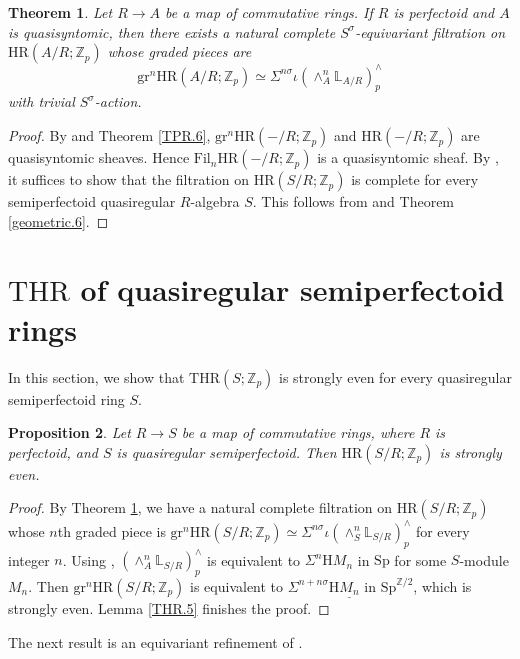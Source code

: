\documentclass[10pt]{amsart}
\newtheorem{thm}{Theorem}[section]
\newtheorem{prop}[thm]{Proposition}
\theoremstyle{definition}
\numberwithin{equation}{section}
\renewcommand{\L}{\mathbb{L}}
\newcommand{\Z}{\mathbb{Z}}
\newcommand{\rH}{\mathrm{H}}
\newcommand{\ul}{\underline}
\newcommand{\Sp}{\mathrm{Sp}}
\newcommand{\gr}{\mathrm{gr}}
\newcommand{\Fil}{\mathrm{Fil}}
\newcommand{\HR}{\mathrm{HR}}
\newcommand{\THR}{\mathrm{THR}}
\begin{document}
{\begin{thm}
\label{descent.3}
Let $R\to A$ be a map of commutative rings.
If $R$ is perfectoid and $A$ is quasisyntomic,
then there exists a natural complete $S^\sigma$-equivariant filtration on $\HR(A/R;\Z_p)$ whose graded pieces are
\[
\gr^n \HR(A/R;\Z_p)
\simeq
\Sigma^{n\sigma}\iota (\wedge_A^n \L_{A/R})_p^\wedge
\]
with trivial $S^\sigma$-action.
\end{thm}
\begin{proof}
By \cite[Remark 4.9]{BMS19} and Theorem \ref{TPR.6},
$\gr^n \HR(-/R;\Z_p)$ and $\HR(-/R;\Z_p)$ are quasisyntomic sheaves.
Hence $\Fil_n\HR(-/R;\Z_p)$ is a quasisyntomic sheaf.
By \cite[Proposition 4.31, Variant 4.33]{BMS19},
it suffices to show that the filtration on $\HR(S/R;\Z_p)$ is complete for every semiperfectoid quasiregular $R$-algebra $S$.
This follows from \cite[Lemma 4.25]{BMS19} and Theorem \ref{geometric.6}.
\end{proof}


\section{\texorpdfstring{$\THR$}{THR} of quasiregular semiperfectoid rings}

In this section,
we show that $\THR(S;\Z_p)$ is strongly even for every quasiregular semiperfectoid ring $S$.




\begin{prop}
\label{THR.7}
Let $R\to S$ be a map of commutative rings,
where $R$ is perfectoid,
and $S$ is quasiregular semiperfectoid.
Then $\HR(S/R;\Z_p)$ is strongly even.
\end{prop}
\begin{proof}
By Theorem \ref{descent.3},
we have a natural complete filtration on $\HR(S/R;\Z_p)$ whose $n$th graded piece is
\(
\gr^n \HR(S/R;\Z_p)
\simeq
\Sigma^{n\sigma} \iota (\wedge_{S}^n  \L_{S/R})_p^\wedge
\)
for every integer $n$.
Using \cite[Lemma 5.14(1)]{BMS19},
$(\wedge_{A}^n  \L_{S/R})_p^\wedge$ is equivalent to $\Sigma^n \rH M_n$ in $\Sp$ for some $S$-module $M_n$.
Then $\gr^n \HR(S/R;\Z_p)$ is equivalent to $\Sigma^{n+n\sigma} \rH \ul{M_n}$ in $\Sp^{\Z/2}$,
which is strongly even.
Lemma \ref{THR.5} finishes the proof.
\end{proof}

The next result is an equivariant refinement of \cite[Theorem 7.1(1)]{BMS19}.

}
\end{document}
